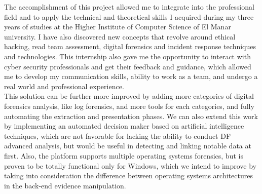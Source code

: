 The accomplishment of this project allowed me to integrate into the professional field and to apply the technical and theoretical skills I acquired during my three years of studies at the Higher Institute of Computer Science of El Manar university. I have also discovered new concepts that revolve around ethical hacking, read team assessment, digital forensics and incident response techniques and technologies. This internship also gave me the opportunity to interact with cyber security professionals and get their feedback and guidance, which allowed me to develop my communication skills, ability to work as a team, and undergo a real world and professional \vspace{3mm}experience.\\
This solution can be further more improved by adding more categories of digital forensics analysis, like log forensics, and more tools for each categories, and fully automating the extraction and presentation phases. We can also extend this work by implementing an automated decision maker based on artificial intelligence techniques, which are not favorable for lacking the ability to conduct DF advanced analysis, but would be useful in detecting and linking notable data at first. Also, the platform supports multiple operating systems forensics, but is proven to be totally functional only for Windows, which we intend to improve by taking into consideration the difference between operating systems architectures in the back-end evidence manipulation.